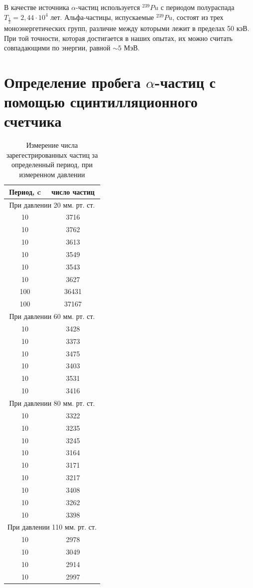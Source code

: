 \documentclass[a4paper,14pt]{extarticle}
\begin{document}
В качестве источника $\alpha$-частиц используется $^{239}Pu$ с периодом полураспада $T_{\frac{1}{2}}=2,44\cdot10^4$  лет. Альфа-частицы, испускаемые $^{239}Pu$, состоят из трех моноэнергетических групп, различие между которыми лежит в пределах 50 кэВ. При той точности, которая достигается в наших опытах, их можно считать совпадающими по энергии, равной $\sim 5$ МэВ. 
\newpage
\section{Определение пробега $\alpha$-частиц с помощью сцинтилляционного счетчика} %
\label{sec:определение_пробега_alpha_частиц_с_помощью_сцинтилляционного_счетчика}

\begin{table}[h!]
	\centering
	\caption{Измерение числа зарегестрированных частиц за определенный период, при измеренном давлении}
	\begin{tabular}{|c|c|} 
			\hline	
			Период, c&  число частиц\\
			\hline
			\multicolumn{2}{|c|}{При давлении 20 мм. рт. ст.}\\ \hline
			10	&	3716	\\ \hline
			10	&	3762	\\ \hline
			10	&	3613	\\ \hline
			10	&	3549	\\ \hline
			10	&	3543	\\ \hline
			10	&	3627	\\ \hline
			100	&	36431	\\ \hline
			100	&	37167	\\ \hline
			\multicolumn{2}{|c|}{При давлении 60 мм. рт. ст.}\\ \hline
			10	&	3428	\\ \hline
			10	&	3373	\\ \hline
			10	&	3475	\\ \hline
			10	&	3403	\\ \hline
			10	&	3531	\\ \hline
			10	&	3416	\\ \hline
			\multicolumn{2}{|c|}{При давлении 80 мм. рт. ст.}\\ \hline
			10	&	3322	\\ \hline
			10	&	3235	\\ \hline
			10	&	3245	\\ \hline
			10	&	3164	\\ \hline
			10	&	3171	\\ \hline
			10	&	3217	\\ \hline
			10	&	3408	\\ \hline
			10	&	3262	\\ \hline
			10	&	3398	\\ \hline
			\multicolumn{2}{|c|}{При давлении 110 мм. рт. ст.}\\ \hline
			10	&	2978	\\ \hline
			10	&	3049	\\ \hline
			10	&	2914	\\ \hline
			10	&	2997	\\ \hline
			

\end{tabular}
\end{table}
\end{document}
